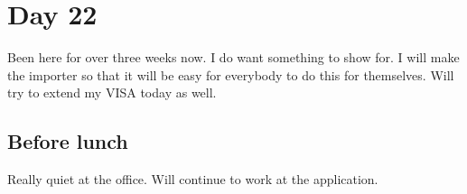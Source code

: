 \section{Day 22}
Been here for over three weeks now.
I do want something to show for.
I will make the importer so that it will be easy for everybody to do this for themselves.
Will try to extend my VISA today as well.
\subsection{Before lunch}
Really quiet at the office.
Will continue to work at the application.